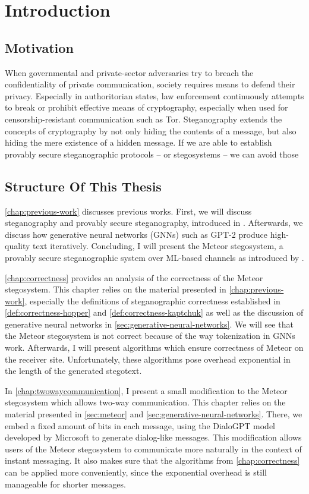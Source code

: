 \chapter{Introduction}

\section{Motivation}

When governmental and private-sector adversaries try to breach the confidentiality of private communication, society requires means to defend their privacy.
Especially in authoritorian states, law enforcement continuously attempts to break or prohibit effective means of cryptography, especially when used for censorship-resistant communication such as Tor.
Steganography extends the concepts of cryptography by not only hiding the contents of a message, but also hiding the mere existence of a hidden message.
If we are able to establish provably secure steganographic protocols -- or stegosystems -- we can avoid those 


\section{Structure Of This Thesis}

\autoref{chap:previous-work} discusses previous works.
First, we will discuss steganography and provably secure steganography, introduced in \cite{Hopper04}.
Afterwards, we discuss how generative neural networks (GNNs) such as GPT-2 produce high-quality text iteratively.
Concluding, I will present the Meteor stegosystem, a provably secure steganographic system over ML-based channels as introduced by \cite{Meteor2021}.

\autoref{chap:correctness} provides an analysis of the correctness of the Meteor stegosystem. 
This chapter relies on the material presented in \autoref{chap:previous-work}, especially the definitions of steganographic correctness established in \autoref{def:correctness-hopper} and \autoref{def:correctness-kaptchuk} as well as the discussion of generative neural networks in \autoref{sec:generative-neural-networks}.
We will see that the Meteor stegosystem is not correct because of the way tokenization in GNNs work.
Afterwards, I will present algorithms which ensure correctness of Meteor on the receiver site.
Unfortunately, these algorithms pose overhead exponential in the length of the generated stegotext.

In \autoref{chap:twowaycommunication}, I present a small modification to the Meteor stegosystem which allows two-way communication.
This chapter relies on the material presented in \autoref{sec:meteor} and \autoref{sec:generative-neural-networks}.
There, we embed a fixed amount of bits in each message, using the DialoGPT model developed by Microsoft \cite{Zhang2020} to generate dialog-like messages.
This modification allows users of the Meteor stegosystem to communicate more naturally in the context of instant messaging.
It also makes sure that the algorithms from \autoref{chap:correctness} can be applied more conveniently, since the exponential overhead is still manageable for shorter messages.

